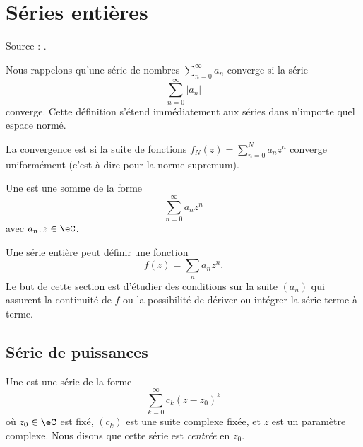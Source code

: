 \section{Séries entières}

Source : \cite{RomainBoilEnt}.

Nous rappelons qu'une série de nombres \( \sum_{n=0}^{\infty}a_n\) converge  si la série
\begin{equation}
    \sum_{n=0}^{\infty}| a_n |
\end{equation}
converge. Cette définition s'étend immédiatement aux séries dans n'importe quel espace normé.

La convergence est  si la suite de fonctions \( f_N(z)=\sum_{n=0}^N a_nz^n\) converge uniformément (c'est à dire pour la norme supremum).

\begin{definition}
    Une  est une somme de la forme
    \begin{equation}
        \sum_{n=0}^{\infty}a_nz^n
    \end{equation}
    avec \( a_n,z\in\eC\).    
\end{definition}
Une série entière peut définir une fonction
\begin{equation}
    f(z)=\sum_na_nz^n.
\end{equation}
Le but de cette section est d'étudier des conditions sur la suite \( (a_n)\) qui assurent la continuité de \( f\) ou la possibilité de dériver ou intégrer la série terme à terme.

					\subsection{Série de puissances}

Une  est une série de la forme
\begin{equation}		\label{eqseriepuissance}
	\sum_{k=0}^{\infty}c_k(z-z_0)^k
\end{equation}
où $z_0\in \eC$ est fixé, $(c_k)$ est une suite complexe fixée, et $z$ est un paramètre complexe. Nous disons que cette série est \emph{centrée} en $z_0$.

